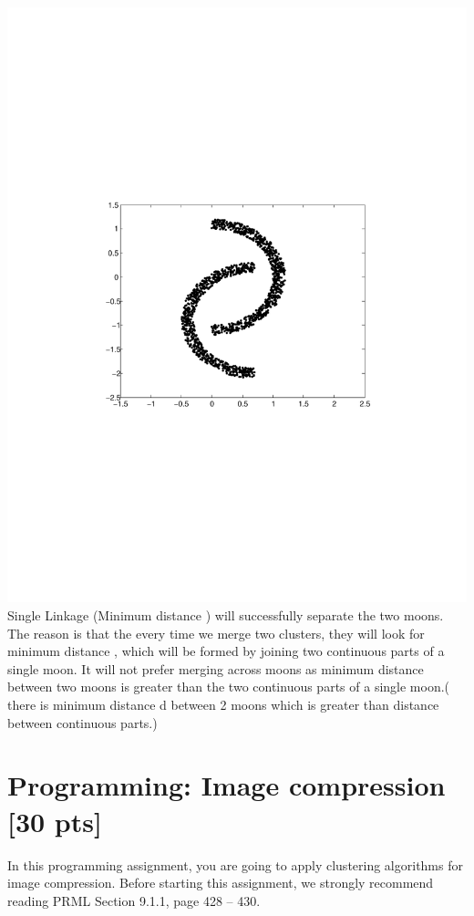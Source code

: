 \documentclass[twoside,10pt]{article}
\begin{document}
\includegraphics[trim = 0mm 90mm 0mm 90mm, clip, width = \linewidth]{clustering}
Single Linkage (Minimum distance ) will successfully separate the two moons. The reason is that the every time we merge  two clusters, they will look for minimum distance , which will be formed by joining two continuous parts of a single moon. It will not prefer merging across moons as minimum distance between two moons is greater than the two continuous parts of a single moon.( there is minimum distance d between 2 moons which is greater than distance between continuous parts.) 
\vspace{1cm}



\section{Programming: Image compression [30 pts]}

In this programming assignment, you are going to apply clustering algorithms for image compression. Before starting this assignment, we strongly recommend reading PRML Section 9.1.1, page 428 -- 430.
\end{document}
